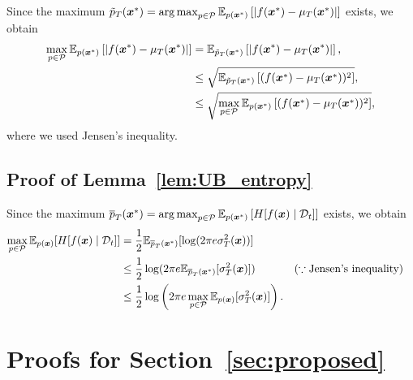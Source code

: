 Since the maximum $\tilde{p}_T(\boldsymbol{x}^{*}) = \operatorname*{arg\,max}_{p \in {\cal P}} \mathbb{E}_{p(\boldsymbol{x}^{*})} \left[ |f(\boldsymbol{x}^{*}) - \mu_T(\boldsymbol{x}^{*})| \right] $ exists, we obtain
\begin{align*}
    \max_{p \in {\cal P}} \mathbb{E}_{p(\boldsymbol{x}^{*})} \left[ |f(\boldsymbol{x}^{*}) - \mu_T(\boldsymbol{x}^{*})| \right] 
    &= \mathbb{E}_{\tilde{p}_T(\boldsymbol{x}^{*})} \left[ |f(\boldsymbol{x}^{*}) - \mu_T(\boldsymbol{x}^{*})| \right], \\
    &\leq \sqrt{ \mathbb{E}_{\tilde{p}_T(\boldsymbol{x}^{*})} \left[ (f(\boldsymbol{x}^{*}) - \mu_T(\boldsymbol{x}^{*}))^2 \right]}, \\
    &\leq \sqrt{ \max_{p \in {\cal P}} \mathbb{E}_{p(\boldsymbol{x}^{*})} \left[ (f(\boldsymbol{x}^{*}) - \mu_T(\boldsymbol{x}^{*}))^2 \right]},
\end{align*}
where we used Jensen's inequality.

\subsection{Proof of Lemma~\ref{lem:UB_entropy}}
\label{sec:UB_entropy_proof}

Since the maximum $\overline{p}_T(\boldsymbol{x}^{*}) = \operatorname*{arg\,max}_{p \in {\cal P}} \mathbb{E}_{p(\boldsymbol{x}^{*})} \left[ H[f(\boldsymbol{x}) \mid {\cal D}_t] \right] $ exists, we obtain
\begin{align*}
    \max_{p \in {\cal P}} \mathbb{E}_{p(\boldsymbol{x})}[ H[f(\boldsymbol{x}) \mid {\cal D}_t] ]
    &= \frac{1}{2} \mathbb{E}_{\overline{p}_T(\boldsymbol{x}^{*})}[ \log(2\pi e \sigma_{T}^2(\boldsymbol{x})) ] \\
    &\leq \frac{1}{2} \log(2\pi e \mathbb{E}_{\overline{p}_T(\boldsymbol{x}^{*})}[  \sigma_{T}^2(\boldsymbol{x}) ]) && (\because \text{Jensen's inequality}) \\
    &\leq \frac{1}{2} \log \left( 2\pi e \max_{p \in {\cal P}} \mathbb{E}_{p (\boldsymbol{x})}[ \sigma_{T}^2(\boldsymbol{x}) ] \right).
\end{align*}



\section{Proofs for Section~\ref{sec:proposed}}
\label{sec:proposed_proof}


